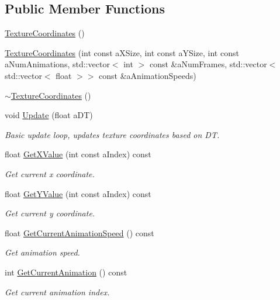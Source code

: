\subsection*{Public Member Functions}
\begin{DoxyCompactItemize}
\item 
\hyperlink{classTextureCoordinates_a5691b6fe540096606a00b21441b00cfc}{Texture\+Coordinates} ()
\item 
\hyperlink{classTextureCoordinates_a4198cca30cd1602d2e78fb37e6cb0982}{Texture\+Coordinates} (int const a\+X\+Size, int const a\+Y\+Size, int const a\+Num\+Animations, std\+::vector$<$ int $>$ const \&a\+Num\+Frames, std\+::vector$<$ std\+::vector$<$ float $>$$>$ const \&a\+Animation\+Speeds)
\item 
\hyperlink{classTextureCoordinates_a6127d77ed41707d1a366c83cc66b2a54}{$\sim$\+Texture\+Coordinates} ()
\item 
void \hyperlink{classTextureCoordinates_a70b6aa6e408a822d6b812e88ad423d59}{Update} (float a\+DT)
\begin{DoxyCompactList}\small\item\em Basic update loop, updates texture coordinates based on DT. \end{DoxyCompactList}\item 
float \hyperlink{classTextureCoordinates_af8058ad5463d5c58548e5fd31b0c7112}{Get\+X\+Value} (int const a\+Index) const 
\begin{DoxyCompactList}\small\item\em Get current x coordinate. \end{DoxyCompactList}\item 
float \hyperlink{classTextureCoordinates_adea1a65980e4019c4d4ef3075106bb41}{Get\+Y\+Value} (int const a\+Index) const 
\begin{DoxyCompactList}\small\item\em Get current y coordinate. \end{DoxyCompactList}\item 
float \hyperlink{classTextureCoordinates_a12bb3e21ff33420dc571ba7a5773aa4c}{Get\+Current\+Animation\+Speed} () const 
\begin{DoxyCompactList}\small\item\em Get animation speed. \end{DoxyCompactList}\item 
int \hyperlink{classTextureCoordinates_a7b2e061d3f6d2ccab46408fa269a7a75}{Get\+Current\+Animation} () const 
\begin{DoxyCompactList}\small\item\em Get current animation index. \end{DoxyCompactList}\item 
$$
\end{DoxyCompactItemize}
